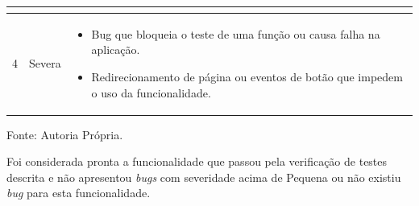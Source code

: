 \begin{table}[H]
\begin{tabularx}{\linewidth}{|c|l|X|}
\begin{itemize}
        \end{itemize}
        \\
        \hline
        4 & Severa &
        \begin{itemize}
            \item Bug que bloqueia o teste de uma função ou causa falha na aplicação.
            \item Redirecionamento de página ou eventos de botão que impedem o uso da funcionalidade.
        \end{itemize}
        \\
        \hline
    \end{tabularx}
    \vspace{0.2cm} %
    
    Fonte: Autoria Própria.
\end{table}

Foi considerada pronta a funcionalidade que passou pela verificação de testes descrita e não apresentou \textit{bugs} com  severidade acima de Pequena ou não existiu \textit{bug} para esta funcionalidade.